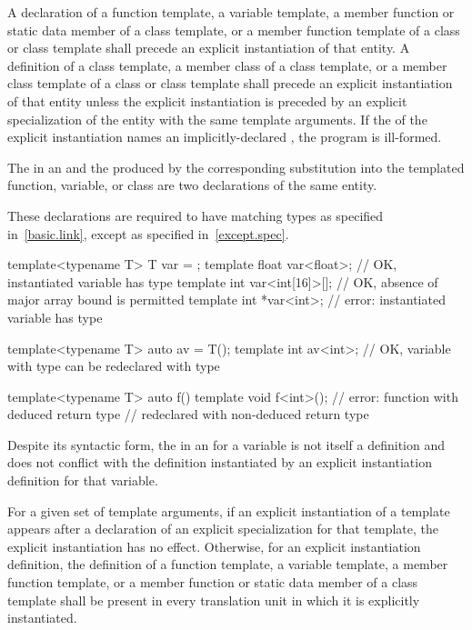 \pnum
A declaration of a function template, a variable template, a member function
or static data member
of a class template, or a member function template of a class or class
template shall precede an explicit instantiation of that entity. A definition
of a class template, a member class of a class template, or a member class
template of a class or class template shall precede an explicit instantiation
of that entity unless the explicit instantiation is preceded by an explicit
specialization of the entity with the same template arguments.
If the
of the explicit instantiation names an implicitly-declared , the program is ill-formed.

\pnum
The  in an  and
the  produced by the corresponding substitution
into the templated function, variable, or class
are two declarations of the same entity.
\begin{note}
These declarations are required to have matching types as specified in~\ref{basic.link}, except as specified in~\ref{except.spec}.
\begin{example}
\begin{codeblock}
template<typename T> T var = {};
template float var<float>;      // OK, instantiated variable has type 
template int var<int[16]>[];    // OK, absence of major array bound is permitted
template int *var<int>;         // error: instantiated variable has type 

template<typename T> auto av = T();
template int av<int>;           // OK, variable with type  can be redeclared with type 

template<typename T> auto f() {}
template void f<int>();         // error: function with deduced return type
                                // redeclared with non-deduced return type
\end{codeblock}
\end{example}
\end{note}
Despite its syntactic form, the  in an  for a variable is not itself a definition and does not conflict with the definition instantiated by an explicit instantiation definition for that variable.

\pnum
For a given set of template arguments, if an explicit
instantiation of a template appears after a declaration of
an explicit specialization for that template, the explicit
instantiation has no effect. Otherwise, for an explicit instantiation
definition, the definition of a
function template, a variable template, a member
function template, or a member function or static
data member of a class template shall be present in every
translation unit in which it is explicitly instantiated.

